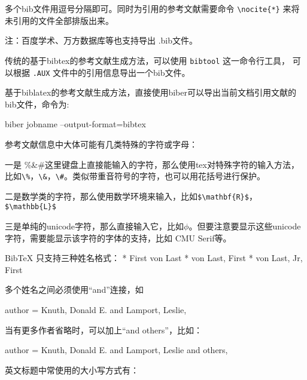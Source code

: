 \begin{texlist}

\end{texlist}

多个bib文件用逗号分隔即可。同时为引用的参考文献需要命令 \verb|\nocite{*}| 来将未引用的文件全部排版出来。

注：百度学术、万方数据库等也支持导出 .bib文件。


传统的基于bibtex的参考文献生成方法，可以使用 \verb|bibtool| 这一命令行工具，
可以根据 \verb|.AUX| 文件中的引用信息导出一个bib文件。

基于biblatex的参考文献生成方法，直接使用biber可以导出当前文档引用文献的bib文件，命令为:

\begin{texlist}
biber jobname --output-format=bibtex
\end{texlist}




参考文献信息中大体可能有几类特殊的字符或字母：

一是 \%\&\#这里键盘上直接能输入的字符，那么使用tex对特殊字符的输入方法，比如\verb|\%|，\verb|\&|，\verb|\#|。类似带重音符号的字符，也可以用花括号进行保护。

二是数学类的字符，那么使用数学环境来输入，比如\verb|$\mathbf{R}$|，\verb|$\mathbb{L}$|

三是单纯的unicode字符，那么直接输入它，比如$\phi$。但要注意要显示这些unicode字符，需要能显示该字符的字体的支持，比如 CMU Serif等。



BibTeX 只支持三种姓名格式： * First von Last * von Last, First * von
Last, Jr, First

多个姓名之间必须使用``and''连接，如

\begin{texlist}
author = {Knuth, Donald E. and Lamport, Leslie},
\end{texlist}

当有更多作者省略时，可以加上“and others”，比如：

\begin{texlist}
author = {Knuth, Donald E. and Lamport, Leslie and others},
\end{texlist}



英文标题中常使用的大小写方式有：

